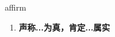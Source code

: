 
\begin{frame}
{\huge affirm}
\begin{center}
\begin{enumerate}\Large
  \item \textbf{声称...为真，肯定...属实}
\end{enumerate}
\end{center}
\end{frame}
